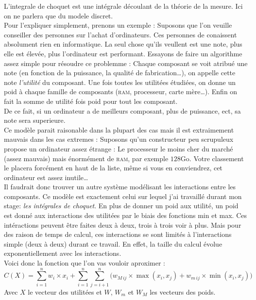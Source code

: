 
L'integrale de choquet est une intégrale découlant de la théorie de la mesure\cite{artch}.
Ici on ne parlera que du modele discret.\\


Pour l'expliquer simplement, prenons un exemple :
Suposons que l'on veuille conseiller des personnes sur l'achat d'ordinateurs.
Ces personnes de conaissent absolument rien en informatique.
La seul chose qu'ils veullent est une note, plus elle est élevée, plus l'ordinateur est performant.
Essayons de faire un algorithme assez simple pour résoudre ce problemme :
Chaque composant se voit atribué une note (en fonction de la puissance, la qualité de fabrication\ldots),
on appelle cette note \textit{l'utilité} du composant.
Une fois toutes les utilitées étudiées, on donne un poid à chaque famille de composants
(\textsc{ram}, processeur, carte mère\ldots).
Enfin on fait la somme de utilité fois poid pour tout les composant.\\
De ce fait, si un ordinateur a de meilleurs composant, plus de puissance, ect, sa note sera superieure.\\


Ce modèle parait raisonable dans la plupart des cas mais il est extraimement mauvais dans les cas extremes :
Suposons qu'un constructeur peu scrupuleux propose un ordinateur assez étrange :
Le processeur le moins cher du marché (assez mauvais) mais énormément de \textsc{ram}, par exemple $128$Go.
Votre classement le placera forcément en haut de la liste, même si vous en conviendrez,
cet ordinateur est assez inutile\ldots\\


Il faudrait donc trouver un autre système modélisant les interactions entre les composants.
Ce modèle est exactement celui sur lequel j'ai travaillé durant mon stage: \textit{les intégrales de choquet}.
En plus de donner un poid aux utilité,
un poid est donné aux interactions des utilitées par le biais des fonctions min et max.
Ces intéractions peuvent être faites deux à deux, trois à trois voir à plus.
Mais pour des raison de temps de calcul, ces interactions se sont limités à l'interactions simple
(deux à deux) durant ce travail.
En effet, la taille du calcul évolue exponentiellement avec les interactions.\\


Voici donc la fonction que l'on vas vouloir aproximer :
\begin{equation}
    \label{eq:choquet}
    C(X)  =
    \sum_{i=1}^{n}
        w_i \times x_i +
    \sum_{i=1}^{n}\sum_{j=i+1}^{n}
    \Big(
        w_{M\,ij} \times \max(x_i,x_j) + w_{m\,ij} \times \min(x_i,x_j)
    \Big)
\end{equation}
Avec $X$ le vecteur des utilitées et $W$, $W_m$ et $W_M$ les vecteurs des poids.
